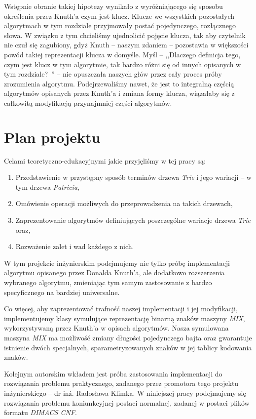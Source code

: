     Wstępnie obranie takiej hipotezy wynikało z wyróżniającego się sposobu określenia przez Knuth'a czym jest klucz. Klucze we wszystkich pozostałych algorytmach w tym rozdziale przyjmowały postać pojedynczego, rozłącznego słowa. W związku z tym chcieliśmy ujednolicić pojęcie klucza, tak aby czytelnik nie czuł się zagubiony, gdyż Knuth -- naszym zdaniem -- pozostawia w większości powód takiej reprezentacji klucza w domyśle. Myśl -- ,,Dlaczego definicja tego, czym jest klucz w tym algorytmie, tak bardzo różni się od innych opisanych w tym rozdziale?~'' -- nie opuszczała naszych głów przez cały proces próby zrozumienia algorytmu. Podejrzewaliśmy nawet, że jest to integralną częścią algorytmów opisanych przez Knuth'a i zmiana formy klucza, wiązałaby się z całkowitą modyfikacją przynajmniej części algorytmów.
		
	\section{Plan projektu}\label{sec:celePracyPlanProjektu}
	
	Celami teoretyczno-edukacyjnymi jakie przyjęliśmy w tej pracy są:
	\begin{enumerate}
	    \item Przedstawienie w przystępny sposób terminów drzewa \emph{Trie} i jego wariacji -- w tym drzewa \emph{Patricia},
	    \item Omówienie operacji możliwych do przeprowadzenia na takich drzewach,
	    \item Zaprezentowanie algorytmów definiujących poszczególne wariacje drzewa \emph{Trie} oraz,
	    \item Rozważenie zalet i wad każdego z nich.
	\end{enumerate} 
	
	W tym projekcie inżynierskim podejmujemy nie tylko próbę implementacji algorytmu opisanego przez Donalda Knuth'a, ale dodatkowo rozszerzenia wybranego algorytmu, zmieniając tym samym zastosowanie z bardzo specyficznego na bardziej uniwersalne. 
	
    Co więcej, aby zaprezentować trafność naszej implementacji i jej modyfikacji, implementujemy klasy symulujące reprezentację binarną znaków maszyny \emph{MIX}, wykorzystywaną przez Knuth'a w opisach algorytmów. Nasza symulowana maszyna \emph{MIX} ma możliwość zmiany długości pojedynczego bajta oraz gwarantuje istnienie dwóch specjalnych, sparametryzowanych znaków w jej tablicy kodowania znaków.
	
	Kolejnym autorskim wkładem jest próba zastosowania implementacji do rozwiązania problemu praktycznego, zadanego przez promotora tego projektu inżynierskiego -- dr inż. Radosława Klimka. W niniejszej pracy podejmujemy się rozwiązania problemu koniunkcyjnej postaci normalnej, zadanej w postaci plików formatu \emph{DIMACS CNF}. 
	
